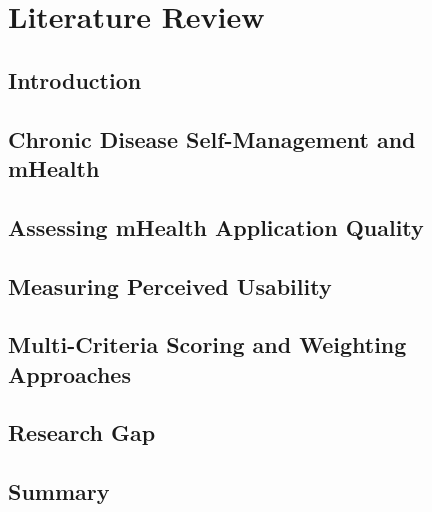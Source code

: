 \chapter{Literature Review}

\section{Introduction}

\section{Chronic Disease Self-Management and mHealth}

\section{Assessing mHealth Application Quality}

\section{Measuring Perceived Usability}

\section{Multi-Criteria Scoring and Weighting Approaches}

\section{Research Gap}

\section{Summary}
